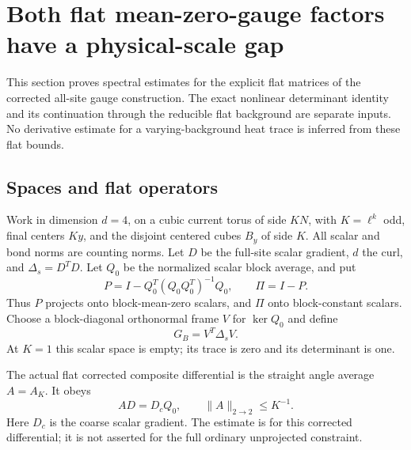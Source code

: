 \documentclass[11pt]{article}
\theoremstyle{remark}
\begin{document}
\section{Both flat mean-zero-gauge factors have a physical-scale gap}
\label{mgs-section}

This section proves spectral estimates for the explicit flat matrices
of the corrected all-site gauge construction.
The exact nonlinear determinant identity and its continuation through
the reducible flat background are separate inputs.
No derivative estimate for a varying-background heat trace is inferred
from these flat bounds.

\subsection{Spaces and flat operators}
\label{mgs-spaces-section}

Work in dimension \(d=4\), on a cubic current torus of side \(KN\),
with \(K=\ell^k\) odd, final centers \(Ky\), and the disjoint centered
cubes \(B_y\) of side \(K\).
All scalar and bond norms are counting norms.
Let \(D\) be the full-site scalar gradient, \(d\) the curl, and
\(\Delta_s=D^TD\).
Let \(Q_0\) be the normalized scalar block average, and put
\begin{equation}
 P=I-Q_0^T(Q_0Q_0^T)^{-1}Q_0,\qquad \Pi=I-P .
 \label{mgs-projections}
\end{equation}
Thus \(P\) projects onto block-mean-zero scalars, and \(\Pi\)
onto block-constant scalars.
Choose a block-diagonal orthonormal frame \(V\) for \(\ker Q_0\)
and define
\begin{equation}
                       G_B=V^T\Delta_sV.
 \label{mgs-ghost}
\end{equation}
At \(K=1\) this scalar space is empty; its trace is zero and
its determinant is one.

The actual flat corrected composite differential is the straight
angle average \(A=A_K\). It obeys
\begin{equation}
 AD=D_cQ_0,\qquad \|A\|_{2\to2}\le K^{-1}.
 \label{mgs-average}
\end{equation}
Here \(D_c\) is the coarse scalar gradient.
The estimate is for this corrected differential; it is not
asserted for the full ordinary unprojected constraint.
\end{document}
